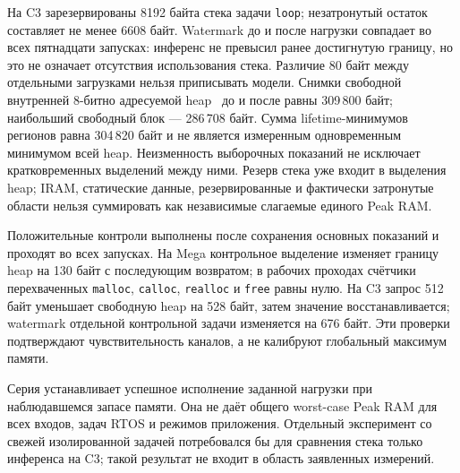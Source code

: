 На C3 зарезервированы 8192 байта стека задачи \texttt{loop}; незатронутый остаток составляет не менее 6608 байт. Watermark до и после нагрузки совпадает во всех пятнадцати запусках: инференс не превысил ранее достигнутую границу, но это не означает отсутствия использования стека. Различие 80 байт между отдельными загрузками нельзя приписывать модели. Снимки свободной внутренней 8-битно адресуемой heap~\cite{EspressifHeap447} до и после равны 309\,800 байт; наибольший свободный блок --- 286\,708 байт. Сумма lifetime-минимумов регионов равна 304\,820 байт и не является измеренным одновременным минимумом всей heap. Неизменность выборочных показаний не исключает кратковременных выделений между ними. Резерв стека уже входит в выделения heap; IRAM, статические данные, резервированные и фактически затронутые области нельзя суммировать как независимые слагаемые единого Peak RAM.

Положительные контроли выполнены после сохранения основных показаний и проходят во всех запусках. На Mega контрольное выделение изменяет границу heap на 130 байт с последующим возвратом; в рабочих проходах счётчики перехваченных \texttt{malloc}, \texttt{calloc}, \texttt{realloc} и \texttt{free} равны нулю. На C3 запрос 512 байт уменьшает свободную heap на 528 байт, затем значение восстанавливается; watermark отдельной контрольной задачи изменяется на 676 байт. Эти проверки подтверждают чувствительность каналов, а не калибруют глобальный максимум памяти.

Серия устанавливает успешное исполнение заданной нагрузки при наблюдавшемся запасе памяти. Она не даёт общего worst-case Peak RAM для всех входов, задач RTOS и режимов приложения. Отдельный эксперимент со свежей изолированной задачей потребовался бы для сравнения стека только инференса на C3; такой результат не входит в область заявленных измерений.
